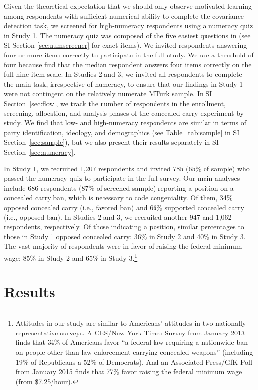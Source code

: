 \documentclass[12pt, letterpaper]{article}
\begin{document}
Given the theoretical expectation that we should only observe motivated learning among respondents with sufficient numerical ability to complete the covariance detection task, we screened for high-numeracy respondents using a numeracy quiz in Study 1. The numeracy quiz was composed of the five easiest questions in \citet{weller2012} (see SI Section \ref{sec:numscreener} for exact items). We invited respondents answering four or more items correctly to participate in the full study. We use a threshold of four because \citet{kahan2017} find that the median respondent answers four items correctly on the full nine-item scale. In Studies 2 and 3, we invited all respondents to complete the main task, irrespective of numeracy, to ensure that our findings in Study 1 were not contingent on the relatively numerate MTurk sample.
In SI Section~\ref{sec:flow}, we track the number of respondents in the enrollment, screening, allocation, and analysis phases of the concealed carry experiment by study.
We find that low- and high-numeracy respondents are similar in terms of party identification, ideology, and demographics (see Table~\ref{tab:sample} in SI Section~\ref{sec:sample}), but we also present their results separately in SI Section~\ref{sec:numeracy}.

In Study 1, we recruited 1,207 respondents and invited 785 (65\% of sample) who passed the numeracy quiz to participate in the full survey. Our main analyses include 686 respondents (87\% of screened sample) reporting a position on a concealed carry ban, which is necessary to code congeniality. Of them, 34\% opposed concealed carry (i.e., favored ban) and 66\% supported concealed carry (i.e., opposed ban). In Studies 2 and 3, we recruited another 947 and 1,062 respondents, respectively. Of those indicating a position, similar percentages to those in Study 1 opposed concealed carry: 36\% in Study 2 and 40\% in Study 3. The vast majority of respondents were in favor of raising the federal minimum wage: 85\% in Study 2 and 65\% in Study 3.\footnote{
Attitudes in our study are similar to Americans' attitudes in two nationally representative surveys. A CBS/New York Times Survey from January 2013 finds that 34\% of Americans favor ``a federal law requiring a nationwide ban on people other than law enforcement carrying concealed weapons'' (including 19\% of Republicans a 52\% of Democrats). And an Associated Press/GfK Poll from January 2015 finds that 77\% favor raising the federal minimum wage (from \$7.25/hour).}

\section*{Results}
\end{document}
